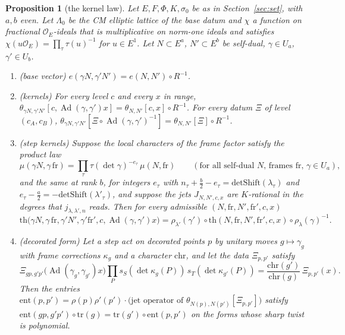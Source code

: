 \documentclass[11pt]{article}
\newcommand{\Ad}{\operatorname{Ad}}
\newcommand{\OEr}{\mathcal O_E}
\newtheorem{proposition}[theorem]{Proposition}
\theoremstyle{definition}
\theoremstyle{remark}
\begin{document}
\begin{proposition}[the kernel law]\label{prop:A}
Let $E,F,\Phi,K,\sigma_0$ be as in Section~\ref{sec:set}, with $a,b$ even. Let $\Lambda_0$ be the CM elliptic lattice of the base datum and $\chi$ a function on fractional $\OEr$-ideals that is multiplicative on norm-one ideals and satisfies $\chi(u\OEr)=\prod_\tau\tau(u)^{-1}$ for $u\in E^1$. Let $N\subset E^a$, $N'\subset E^b$ be self-dual, $\gamma\in U_a$, $\gamma'\in U_b$.
\begin{enumerate}[label=(\roman*),itemsep=2pt]
\item (base vector) $e(\gamma N,\gamma'N')=e(N,N')\circ R^{-1}$.
\item (kernels) For every level $c$ and every $x$ in range, $\theta_{\gamma N,\gamma'N'}[c,\Ad(\gamma,\gamma')x]=\theta_{N,N'}[c,x]\circ R^{-1}$. For every datum $\Xi$ of level $(c_A,c_B)$, $\theta_{\gamma N,\gamma'N'}[\Xi\circ\Ad(\gamma,\gamma')^{-1}]=\theta_{N,N'}[\Xi]\circ R^{-1}$.
\item (step kernels) Suppose the local characters of the frame factor satisfy the product law
\[
\mu(\gamma N,\gamma\,\mathrm{fr})=\prod_\tau\tau(\det\gamma)^{-e_\tau}\,\mu(N,\mathrm{fr})\qquad(\text{for all self-dual }N\text{, frames fr, }\gamma\in U_a),
\]
and the same at rank $b$, for integers $e_\tau$ with $n_\tau+\tfrac b2-e_\tau=\mathrm{detShift}(\lambda_\tau)$ and $e_\tau-\tfrac a2=-\mathrm{detShift}(\lambda'_\tau)$, and suppose the jets $J_{N,N',c,x}$ are $K$-rational in the degrees that $j_{\lambda,\lambda',n}$ reads. Then for every admissible $(N,\mathrm{fr},N',\mathrm{fr}',c,x)$
\[
\mathrm{th}\bigl(\gamma N,\gamma\,\mathrm{fr},\gamma'N',\gamma'\mathrm{fr}',c,\Ad(\gamma,\gamma')x\bigr)=\rho_{\lambda'}(\gamma')\circ\mathrm{th}(N,\mathrm{fr},N',\mathrm{fr}',c,x)\circ\rho_\lambda(\gamma)^{-1}.
\]
\item (decorated form) Let a step act on decorated points $p$ by unitary moves $g\mapsto\gamma_g$ with frame corrections $\kappa_g$ and a character $\mathrm{chr}$, and let the data $\Xi_{p,p'}$ satisfy
\[
\Xi_{gp,g'p'}\bigl(\Ad(\gamma_g,\gamma_{g'})x\bigr)\prod_{P}s_S(\det\kappa_g(P))\,s_T(\det\kappa_{g'}(P))=\frac{\mathrm{chr}(g')}{\mathrm{chr}(g)}\,\Xi_{p,p'}(x).
\]
Then the entries $\mathrm{ent}(p,p')=\rho(p)\rho'(p')\cdot\bigl(\text{jet operator of }\theta_{N(p),N(p')}[\Xi_{p,p'}]\bigr)$ satisfy $\mathrm{ent}(gp,g'p')\circ\mathrm{tr}(g)=\mathrm{tr}(g')\circ\mathrm{ent}(p,p')$ on the forms whose sharp twist is polynomial.
\end{enumerate}
\end{proposition}
\end{document}
